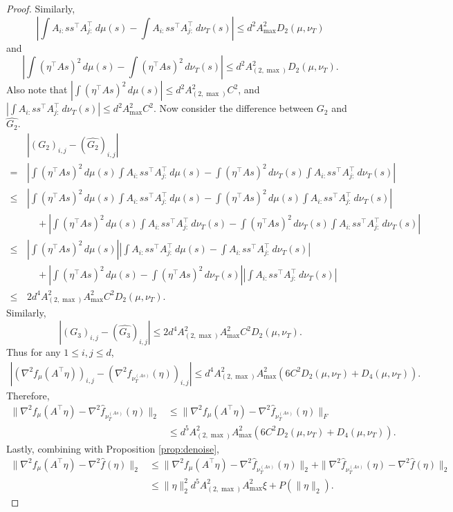\begin{proof}
Similarly, 
\[
\left| \int A_{i:}ss^{\top}A_{j:}^{\top} \,d\mu(s) - \int A_{i:}ss^{\top}A_{j:}^{\top} \,d\nu_T(s) \right| \le d^2 A_{\max}^2 D_2(\mu,\nu_T)
\]
 and 
\[
\left| \int (\eta^{\top}As)^2\,d\mu(s) -\int (\eta^{\top}As)^2\,d\nu_T(s) \right| \le d^2 A_{(2,\max)}^2 D_2(\mu,\nu_T).
\]
Also note that $ \left| \int (\eta^{\top}As)^2\,d\mu(s) \right| \le d^2A_{(2,\max)}^2 C^2$, and
$\left| \int A_{i:}ss^{\top}A_{j:}^{\top} \,d\nu_T(s) \right| \le d^2A_{\max}^2 C^2$.
Now consider the difference between $G_2$ and $\hat{G_2}$. 
\begin{align*}
& \left| (G_2)_{i,j} - (\hat{G_2})_{i,j} \right| \\
=\, & \left| \int (\eta^{\top}As)^2\,d\mu(s) \int A_{i:}ss^{\top}A_{j:}^{\top} \,d\mu(s)  - 
\int (\eta^{\top}As)^2\,d\nu_T(s) \int A_{i:}ss^{\top}A_{j:}^{\top} \,d\nu_T(s) \right| \\
\le \, & \left| \int (\eta^{\top}As)^2\,d\mu(s) \int A_{i:}ss^{\top}A_{j:}^{\top} \,d\mu(s)  - 
\int (\eta^{\top}As)^2\,d\mu(s) \int A_{i:}ss^{\top}A_{j:}^{\top} \,d\nu_T(s) \right| \\ 
& \quad + \left| \int (\eta^{\top}As)^2\,d\mu(s) \int A_{i:}ss^{\top}A_{j:}^{\top} \,d\nu_T(s)  - 
\int (\eta^{\top}As)^2\,d\nu_T(s) \int A_{i:}ss^{\top}A_{j:}^{\top} \,d\nu_T(s) \right| \\
\le\, & \left| \int (\eta^{\top}As)^2\,d\mu(s) \right| \left|\int A_{i:}ss^{\top}A_{j:}^{\top} \,d\mu(s) - \int A_{i:}ss^{\top}A_{j:}^{\top} \,d\nu_T(s) \right| \\
& \quad + \left| \int (\eta^{\top}As)^2\,d\mu(s) -\int (\eta^{\top}As)^2\,d\nu_T(s) \right| \left| \int A_{i:}ss^{\top}A_{j:}^{\top} \,d\nu_T(s) \right| \\
\le\, & 2 d^4  A_{(2,\max)}^2A_{\max}^2C^2D_2(\mu, \nu_T).
\end{align*}
Similarly,
\[
\left| (G_3)_{i,j} - (\hat{G_3})_{i,j} \right| \le 2 d^4  A_{(2,\max)}^2A_{\max}^2C^2D_2(\mu, \nu_T).
\]
Thus for any $1\le i,j\le d$,
\begin{align*}
\left|\left(\nabla^2 f_{\mu}(A^{\top}\eta) \right)_{i,j} - \left(\nabla^2 \hat{f}_{\nu_T^{(As)}}(\eta) \right)_{i,j} \right| 
\le 
d^4  A_{(2,\max)}^2A_{\max}^2\left( 6C^2D_2(\mu, \nu_T) + D_4(\mu, \nu_T)\right).
\end{align*}
Therefore, 
\begin{align*}
\|\nabla^2 f_{\mu}(A^{\top}\eta) - \nabla^2 \hat{f}_{\nu_T^{(As)}}(\eta)  \|_2 & \le \|\nabla^2 f_{\mu}(A^{\top}\eta) - \nabla^2 \hat{f}_{\nu_T^{(As)}}(\eta) \|_F \\
& \le d^5  A_{(2,\max)}^2A_{\max}^2\left( 6C^2D_2(\mu, \nu_T) + D_4(\mu, \nu_T)\right).
\end{align*}
Lastly, combining with Proposition \ref{prop:denoise}, 
\begin{align*}
\|\nabla^2 f_{\mu}(A^{\top}\eta) - \nabla^2\hat{f}(\eta)\|_2 & \le \|\nabla^2 f_{\mu}(A^{\top}\eta) - \nabla^2 \hat{f}_{\nu_T^{(As)}}(\eta)\|_2 + \| \nabla^2 \hat{f}_{\nu_T^{(As)}}(\eta) - \nabla^2\hat{f}(\eta)\|_2 \\
&  \le \|\eta\|_2^2  d^5 A_{(2,\max)}^2A_{\max}^2\xi + P(\|\eta\|_2).
\end{align*}
\end{proof}
